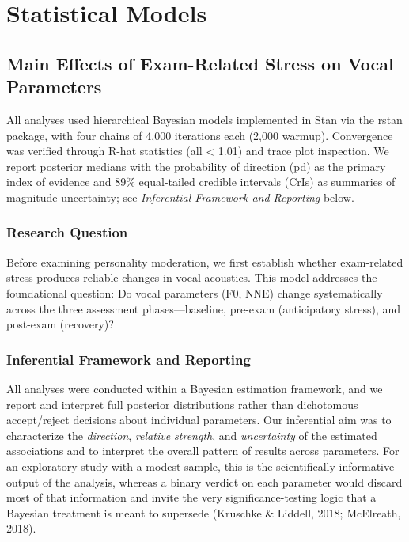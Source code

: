 \documentclass[
  english,
  man,floatsintext]{apa6}
\begin{document}
\newpage

\section{Statistical Models}\label{statistical-models}

\subsection{Main Effects of Exam-Related Stress on Vocal Parameters}\label{main-effects-of-exam-related-stress-on-vocal-parameters}

All analyses used hierarchical Bayesian models implemented in Stan via the rstan package, with four chains of 4,000 iterations each (2,000 warmup). Convergence was verified through R-hat statistics (all \textless{} 1.01) and trace plot inspection. We report posterior medians with the probability of direction (pd) as the primary index of evidence and 89\% equal-tailed credible intervals (CrIs) as summaries of magnitude uncertainty; see \emph{Inferential Framework and Reporting} below.

\subsubsection{Research Question}\label{research-question}

Before examining personality moderation, we first establish whether exam-related stress produces reliable changes in vocal acoustics. This model addresses the foundational question: Do vocal parameters (F0, NNE) change systematically across the three assessment phases---baseline, pre-exam (anticipatory stress), and post-exam (recovery)?

\subsubsection{Inferential Framework and Reporting}\label{inferential-framework-and-reporting}

All analyses were conducted within a Bayesian estimation framework, and we report and
interpret full posterior distributions rather than dichotomous accept/reject decisions
about individual parameters. Our inferential aim was to characterize the \emph{direction},
\emph{relative strength}, and \emph{uncertainty} of the estimated associations and to interpret the
overall pattern of results across parameters. For an exploratory study with a modest
sample, this is the scientifically informative output of the analysis, whereas a binary
verdict on each parameter would discard most of that information and invite the very
significance-testing logic that a Bayesian treatment is meant to supersede
(Kruschke \& Liddell, 2018; McElreath, 2018).
\end{document}
